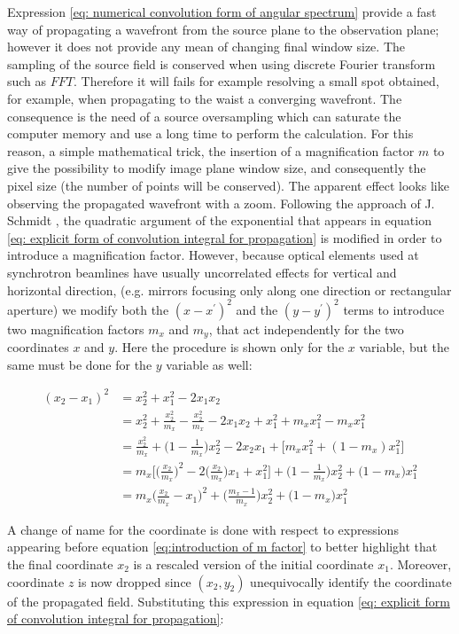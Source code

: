 \documentclass{iucr}              %
\begin{document}
Expression \ref{eq: numerical convolution form of angular spectrum} provide a fast way of propagating a wavefront from the source plane to the observation plane; however it does not provide any mean of changing final window size. The sampling of the source field is conserved when using discrete Fourier transform such as $FFT$. Therefore it will fails for example resolving a small spot obtained, for example, when propagating to the waist a converging wavefront. The consequence is the need of a source oversampling which can saturate the computer memory and use a long time to perform the calculation. For this reason, a simple mathematical trick, the insertion of a magnification factor $m$ to give the possibility to modify image plane window size, and consequently the pixel size (the number of points will be conserved). The apparent effect looks like observing the propagated wavefront with a zoom. Following the approach of J. Schmidt \cite{schmidt}, the quadratic argument of the exponential that appears in equation \ref{eq: explicit form of convolution integral for propagation} is modified in order to introduce a magnification factor. However, because optical elements used at synchrotron beamlines have usually uncorrelated effects for vertical and horizontal direction, (e.g. mirrors focusing only along one direction or rectangular aperture) we modify both the $(x - x^\prime)^2$ and the $(y - y^\prime)^2$ terms to introduce two magnification factors $m_x$ and $m_y$, that act independently for the two coordinates $x$ and $y$. Here the procedure is shown only for the $x$ variable, but the same must be done for the $y$ variable as well: 

\begin{align}\label{eq:introduction of m factor}
(x_2 - x_1)^2 &= x_2^2 + x_1^2 -2 x_1 x_2 \nonumber \\
&=x_2^2 + \frac{x_2^2}{m_x} - \frac{x_2^2}{m_x} - 2 x_1 x_2 + x_1^2 + m_x x_1^2 - m_x x_1^2 \nonumber\\
&=\frac {x_2^2}{m_x} + \Big ( 1- \frac{1}{m_x}\Big) x_2^2 -2 x_2 x_1 + \Big [m_x x_1^2 + (1- m_x) x_1^2 \Big] \nonumber\\
&=m_x \Big [\Big(\frac{x_2}{m_x}\Big)^2 - 2 \Big( \frac{x_2}{m_x} \Big)x_1 + x_1^2\Big] + \Big(1-\frac{1}{m_x}\Big)x_2^2 + \Big(1-m_x\Big)x_1^2 \nonumber\\
&=m_x \Big (\frac{x_2}{m_x}-x_1\Big)^2 + \Big (\frac{m_x - 1}{m_x}\Big)x_2^2 + \Big(1-m_x\Big)x_1^2
\end{align}

A change of name for the coordinate is done  with respect to expressions appearing before equation \ref{eq:introduction of m factor} to better highlight that the final coordinate $x_2$ is a rescaled version of the initial coordinate $x_1$. Moreover, coordinate $z$ is now dropped since $(x_2,y_2)$ unequivocally identify the coordinate of the propagated field.
Substituting this expression in equation \ref{eq: explicit form of convolution integral for propagation}:
\end{document}
